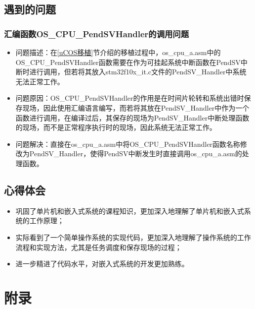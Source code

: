 \documentclass[a4paper]{ctexart}
\begin{document}
\begin{spacing}{1.3}
	\subsection{遇到的问题}
	\subsubsection*{汇编函数OS\_CPU\_PendSVHandler的调用问题}
	\begin{itemize}
		\item 问题描述：在\ref{uCOS移植}节介绍的移植过程中，os\_cpu\_a.asm中的OS\_CPU\_PendSVHandler函数需要在作为可挂起系统中断函数在PendSV中断时进行调用，但若将其放入stm32f10x\_it.c文件的PendSV\_Handler中系统无法正常工作。
		\item 问题原因：OS\_CPU\_PendSVHandler的作用是在时间片轮转和系统出错时保存现场，因此使用汇编语言编写，而若将其放在PendSV\_Handler中作为一个函数进行调用，在编译过后，其保存的现场为PendSV\_Handler中断处理函数的现场，而不是正常程序执行时的现场，因此系统无法正常工作。
		\item 问题解决：直接在os\_cpu\_a.asm中将OS\_CPU\_PendSVHandler函数名称修改为PendSV\_Handler，使得PendSV中断发生时直接调用os\_cpu\_a.asm的处理函数。
	\end{itemize}

	\subsection{心得体会}
	\begin{itemize}
		\item 巩固了单片机和嵌入式系统的课程知识，更加深入地理解了单片机和嵌入式系统的工作原理；
		\item 实际看到了一个简单操作系统的实现代码，更加深入地理解了操作系统的工作流程和实现方法，尤其是任务调度和保存现场的过程；
		\item 进一步精进了代码水平，对嵌入式系统的开发更加熟练。
	\end{itemize}

\end{spacing}
\newpage
\section*{附录}\appendix
\end{document}
